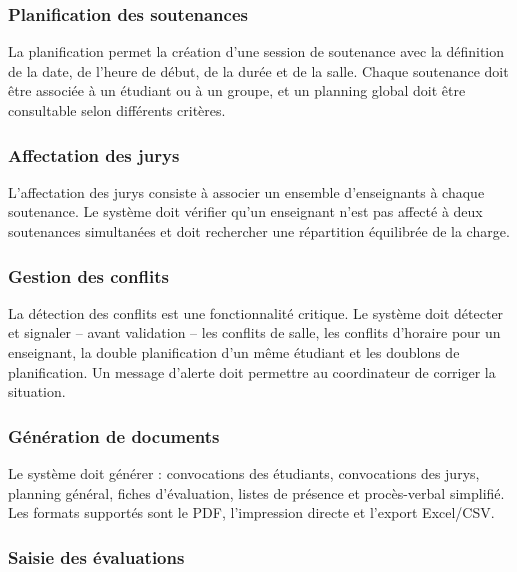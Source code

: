 \documentclass[12pt,a4paper]{article}
\begin{document}
\subsubsection{Planification des soutenances}
\label{subsubsec:planification}

La planification permet la création d'une session de soutenance avec la
définition de la date, de l'heure de début, de la durée et de la salle. Chaque
soutenance doit être associée à un étudiant ou à un groupe, et un planning
global doit être consultable selon différents critères.

\subsubsection{Affectation des jurys}
\label{subsubsec:affectation_jurys}

L'affectation des jurys consiste à associer un ensemble d'enseignants à chaque
soutenance. Le système doit vérifier qu'un enseignant n'est pas affecté à deux
soutenances simultanées et doit rechercher une répartition équilibrée de la
charge.

\subsubsection{Gestion des conflits}
\label{subsubsec:gestion_conflits}

La détection des conflits est une fonctionnalité critique. Le système doit
détecter et signaler -- avant validation -- les conflits de salle, les conflits
d'horaire pour un enseignant, la double planification d'un même étudiant et les
doublons de planification. Un message d'alerte doit permettre au coordinateur de
corriger la situation.

\subsubsection{Génération de documents}
\label{subsubsec:generation_documents}

Le système doit générer : convocations des étudiants, convocations des jurys,
planning général, fiches d'évaluation, listes de présence et procès-verbal
simplifié. Les formats supportés sont le PDF, l'impression directe et l'export
Excel/CSV.

\subsubsection{Saisie des évaluations}
\label{subsubsec:saisie_evaluations}
\end{document}
